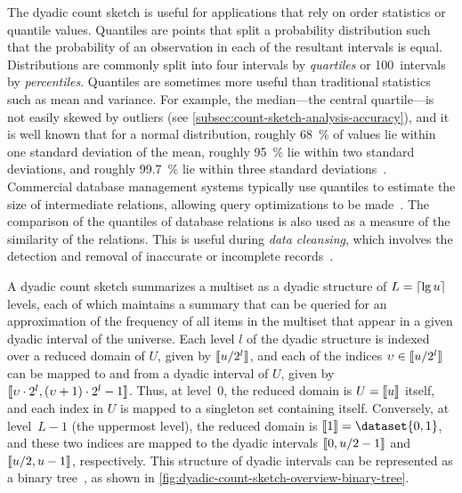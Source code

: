 The dyadic count sketch is useful for applications that rely on order statistics or quantile values.
Quantiles are points that split a probability distribution such that the probability of an observation in each of the resultant intervals is equal.
Distributions are commonly split into four intervals by \emph{quartiles} or \num{100}~intervals by \emph{percentiles}.
Quantiles are sometimes more useful than traditional statistics such as mean and variance.
For example, the median---the central quartile---is not easily skewed by outliers (see \cref{subsec:count-sketch-analysis-accuracy}), and it is well known that for a normal distribution, roughly \SI{68}{\percent} of values lie within one standard deviation of the mean, roughly \SI{95}{\percent} lie within two standard deviations, and roughly \SI{99.7}{\percent} lie within three standard deviations~\citep{pukelsheim94}.
Commercial database management systems typically use quantiles to estimate the size of intermediate relations, allowing query optimizations to be made~\citep{dasu02}.
The comparison of the quantiles of database relations is also used as a measure of the similarity of the relations.
This is useful during \emph{data cleansing}, which involves the detection and removal of inaccurate or incomplete records~\citep{dasu02}.

A dyadic count sketch summarizes a multiset as a dyadic structure of \( L = \lceil\lg u\rceil \) levels, each of which maintains a summary that can be queried for an approximation of the frequency of all items in the multiset that appear in a given dyadic interval of the universe.
Each level \( l \) of the dyadic structure is indexed over a reduced domain of \( U \), given by \( \llbracket u / 2^{l}\rrbracket \), and each of the indices \( \upsilon \in \llbracket u / 2^{l}\rrbracket \) can be mapped to and from a dyadic interval of \( U \), given by \( \llbracket\upsilon \cdot 2^{l}, (\upsilon + 1) \cdot 2^{l} - 1\rrbracket \).
Thus, at level~\( 0 \), the reduced domain is \( U = \llbracket u\rrbracket \) itself, and each index in \( U \) is mapped to a singleton set containing itself.
Conversely, at level~\( L - 1 \) (the uppermost level), the reduced domain is \( \dataintegerinterval{1} = \dataset{0, 1} \), and these two indices are mapped to the dyadic intervals \( \llbracket0, u / 2 - 1\rrbracket \) and \( \llbracket u / 2, u - 1\rrbracket \), respectively.
This structure of dyadic intervals can be represented as a binary tree~\citep{cormode20}, as shown in \cref{fig:dyadic-count-sketch-overview-binary-tree}.

